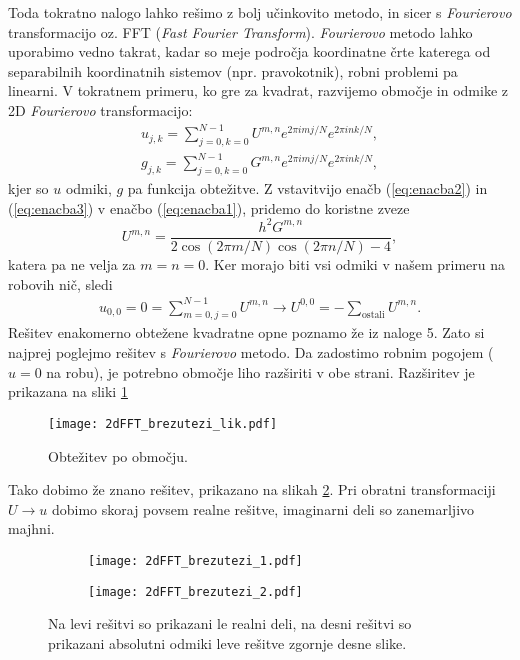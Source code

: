 \documentclass[12pt,a4paper]{article}
\begin{document}
Toda tokratno nalogo lahko rešimo z bolj učinkovito metodo, in sicer s \textit{Fourierovo} transformacijo oz. FFT (\textit{Fast Fourier Transform}). \textit{Fourierovo} metodo lahko uporabimo vedno takrat, kadar so meje področja koordinatne črte katerega od separabilnih koordinatnih sistemov (npr. pravokotnik), robni problemi pa linearni. V tokratnem primeru, ko gre za kvadrat, razvijemo območje in odmike z 2D \textit{Fourierovo} transformacijo:
\begin{align}
u_{j,k}= \sum_{j=0,k=0}^{N-1} U^{m,n} e^{2\pi i mj/N} e^{2\pi i nk/N}, \label{eq:enacba2} \\
g_{j,k}=\sum_{j=0,k=0}^{N-1}  G^{m,n} e^{2\pi i mj/N} e^{2\pi i nk/N},\label{eq:enacba3}
\end{align}
kjer so $u$ odmiki, $g$ pa funkcija obtežitve. Z vstavitvijo enačb (\ref{eq:enacba2}) in (\ref{eq:enacba3}) v enačbo (\ref{eq:enacba1}), pridemo do koristne zveze
\begin{equation}\label{eq:enacba4}
U^{m,n}=\frac{h^{2} G^{m,n}}{2 \cos(2\pi m /N)\cos(2\pi n/N)-4},
\end{equation}
katera pa ne velja za $m=n=0$. Ker morajo biti vsi odmiki v našem primeru na robovih nič, sledi
\begin{align}
u_{0,0}=0 = \sum_{m=0,j=0}^{N-1} U^{m,n} \rightarrow U^{0,0}= -\sum_{\textrm{ostali}} U^{m,n}. 
\end{align}
Rešitev enakomerno obtežene kvadratne opne poznamo že iz naloge 5. Zato si najprej poglejmo rešitev s \textit{Fourierovo} metodo. Da zadostimo robnim pogojem ($u=0$ na robu), je potrebno območje  liho razširiti v obe strani. Razširitev je prikazana na sliki \ref{fig:slika2}
\begin{figure}[H]
\begin{center}
\texttt{[image: 2dFFT\_brezutezi\_lik.pdf]}
\caption{Obtežitev po območju.} \label{fig:slika2}
\end{center}
\end{figure} 
\noindent Tako dobimo že znano rešitev, prikazano na slikah \ref{fig:slika3}. Pri obratni transformaciji $U\rightarrow u$ dobimo skoraj povsem realne rešitve, imaginarni deli so zanemarljivo majhni.
\begin{figure}[H]
    \centering
    \begin{subfigure}[b]{0.5\textwidth}  			
        \texttt{[image: 2dFFT\_brezutezi\_1.pdf]}
    \end{subfigure}
    \begin{subfigure}[b]{0.45\textwidth}  			
        \texttt{[image: 2dFFT\_brezutezi\_2.pdf]}     
    \end{subfigure}
    \caption{Na levi rešitvi so prikazani le realni deli, na desni rešitvi so prikazani absolutni odmiki leve rešitve zgornje desne slike.} \label{fig:slika3}
\end{figure}
\end{document}
